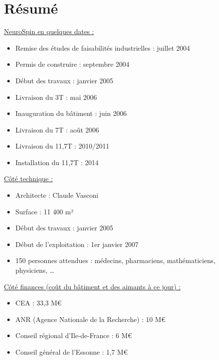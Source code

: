\section{Résumé}

\underline{NeuroSpin en quelques dates :}

\begin{itemize}
	\smallskip
	\item Remise des études de faisabilités industrielles : juillet 2004
	\item Permis de construire : septembre 2004
	\item Début des travaux : janvier 2005
	\item Livraison du 3T : mai 2006
	\item Inauguration du bâtiment : juin 2006
	\item Livraison du 7T : août 2006
	\item Livraison du 11,7T : 2010/2011
	\item Installation du 11,7T : 2014 
\end{itemize}
\medskip

\underline{Côté technique :}

\begin{itemize}
	\smallskip
	\item  Architecte : Claude Vasconi
	\item  Surface : 11 400 m²
	\item  Début des travaux : janvier 2005
	\item  Début de l’exploitation : 1er janvier 2007
	\item  150 personnes attendues : médecins, pharmaciens, mathématiciens, physiciens, …
\end{itemize}
\medskip

\underline{Côté finances (coût du bâtiment et des aimants à ce jour) :}

\begin{itemize}
	\smallskip
	\item CEA : 33,3 M\euro
	\item ANR (Agence Nationale de la Recherche) : 10 M\euro
	\item Conseil régional d’Ile-de-France : 6 M\euro
	\item Conseil général de l’Essonne : 1,7 M\euro
\end{itemize}
